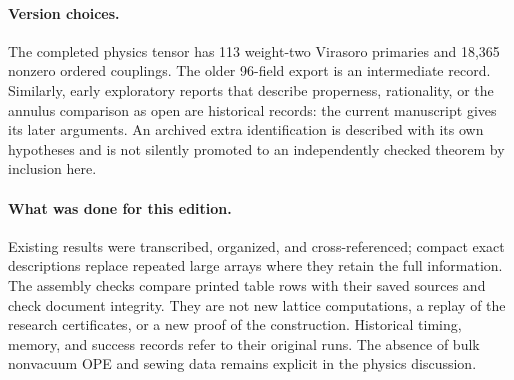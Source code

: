 \paragraph{Version choices.}
The completed physics tensor has 113 weight-two Virasoro primaries and
18,365 nonzero ordered couplings. The older 96-field export is an
intermediate record. Similarly, early exploratory reports that describe
properness, rationality, or the annulus comparison as open are historical
records: the current manuscript gives its later arguments. An archived
extra identification is described with its own hypotheses and is not
silently promoted to an independently checked theorem by inclusion here.

\paragraph{What was done for this edition.}
Existing results were transcribed, organized, and cross-referenced;
compact exact descriptions replace repeated large arrays where they
retain the full information. The assembly checks compare printed table
rows with their saved sources and check document integrity. They are not
new lattice computations, a replay of the research certificates, or a
new proof of the construction. Historical timing, memory, and success
records refer to their original runs. The absence of bulk nonvacuum OPE
and sewing data remains explicit in the physics discussion.
